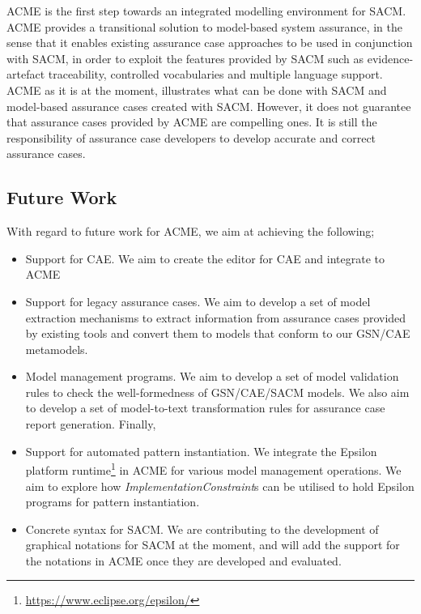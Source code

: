 ACME is the first step towards an integrated modelling environment for SACM.
ACME provides a transitional solution to model-based system assurance, in the sense that it enables existing assurance case approaches to be used in conjunction with SACM, in order to exploit the features provided by SACM such as evidence-artefact traceability, controlled vocabularies and multiple language support.
ACME as it is at the moment, illustrates what can be done with SACM and model-based assurance cases created with SACM.
However, it does not guarantee that assurance cases provided by ACME are compelling ones. 
It is still the responsibility of assurance case developers to develop accurate and correct assurance cases.

\subsection{Future Work}
With regard to future work for ACME, we aim at achieving the following;

\begin{itemize}
	\item Support for CAE. We aim to create the editor for CAE and integrate to ACME
	\item Support for legacy assurance cases. We aim to develop a set of model extraction mechanisms to extract information from assurance cases provided by existing tools and convert them to models that conform to our GSN/CAE metamodels.
	\item Model management programs. We aim to develop a set of model validation rules to check the well-formedness of GSN/CAE/SACM models. We also aim to develop a set of model-to-text transformation rules for assurance case report generation. Finally, 
	\item Support for automated pattern instantiation. We integrate the Epsilon platform runtime\footnote{\url{https://www.eclipse.org/epsilon/}} in ACME for various model management operations. We aim to explore how \textit{ImplementationConstraint}s can be utilised to hold Epsilon programs for pattern instantiation.
	\item Concrete syntax for SACM. We are contributing to the development of graphical notations for SACM at the moment, and will add the support for the notations in ACME once they are developed and evaluated.
\end{itemize}